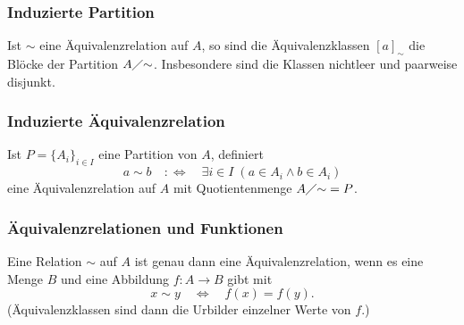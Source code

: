 \subsubsection{Induzierte Partition}
Ist \(\sim\) eine Äquivalenzrelation auf \(A\), so sind die Äquivalenzklassen \([a]_\sim\) die Blöcke der Partition \(A\diagup{\sim}\).
Insbesondere sind die Klassen nichtleer und paarweise disjunkt.

\subsubsection{Induzierte Äquivalenzrelation}
Ist \(P=\{A_i\}_{i\in I}\) eine Partition von \(A\), definiert
\[
a\sim b \quad:\Leftrightarrow\quad \exists i\in I\; (a\in A_i \wedge b\in A_i)
\]
eine Äquivalenzrelation auf \(A\) mit Quotientenmenge \(A\diagup{\sim} = P\).

\subsubsection{Äquivalenzrelationen und Funktionen}
Eine Relation \(\sim\) auf \(A\) ist genau dann eine Äquivalenzrelation, wenn es eine Menge \(B\) und eine Abbildung \(f\colon A\to B\) gibt mit
\[
x\sim y \quad\Leftrightarrow\quad f(x)=f(y).
\]
(Äquivalenzklassen sind dann die Urbilder einzelner Werte von \(f\).)

